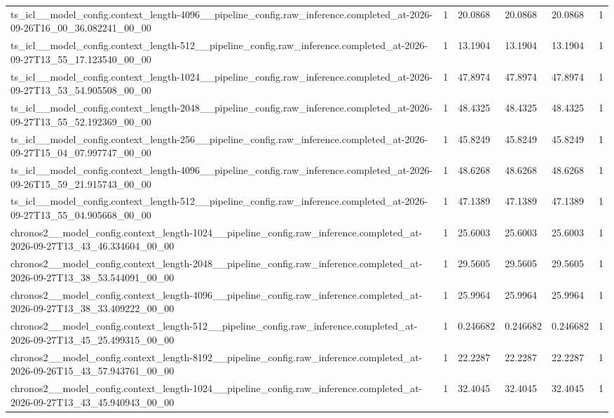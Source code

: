 \begin{tabular}{llllll}
ts\_icl\_\_model\_config.context\_length-4096\_\_pipeline\_config.raw\_inference.completed\_at-2026-09-26T16\_00\_36.082241\_00\_00 & 1 & 20.0868 & 20.0868 & 20.0868 & 1 \\
ts\_icl\_\_model\_config.context\_length-512\_\_pipeline\_config.raw\_inference.completed\_at-2026-09-27T13\_55\_17.123540\_00\_00 & 1 & 13.1904 & 13.1904 & 13.1904 & 1 \\
ts\_icl\_\_model\_config.context\_length-1024\_\_pipeline\_config.raw\_inference.completed\_at-2026-09-27T13\_53\_54.905508\_00\_00 & 1 & 47.8974 & 47.8974 & 47.8974 & 1 \\
ts\_icl\_\_model\_config.context\_length-2048\_\_pipeline\_config.raw\_inference.completed\_at-2026-09-27T13\_55\_52.192369\_00\_00 & 1 & 48.4325 & 48.4325 & 48.4325 & 1 \\
ts\_icl\_\_model\_config.context\_length-256\_\_pipeline\_config.raw\_inference.completed\_at-2026-09-27T15\_04\_07.997747\_00\_00 & 1 & 45.8249 & 45.8249 & 45.8249 & 1 \\
ts\_icl\_\_model\_config.context\_length-4096\_\_pipeline\_config.raw\_inference.completed\_at-2026-09-26T15\_59\_21.915743\_00\_00 & 1 & 48.6268 & 48.6268 & 48.6268 & 1 \\
ts\_icl\_\_model\_config.context\_length-512\_\_pipeline\_config.raw\_inference.completed\_at-2026-09-27T13\_55\_04.905668\_00\_00 & 1 & 47.1389 & 47.1389 & 47.1389 & 1 \\
chronos2\_\_model\_config.context\_length-1024\_\_pipeline\_config.raw\_inference.completed\_at-2026-09-27T13\_43\_46.334604\_00\_00 & 1 & 25.6003 & 25.6003 & 25.6003 & 1 \\
chronos2\_\_model\_config.context\_length-2048\_\_pipeline\_config.raw\_inference.completed\_at-2026-09-27T13\_38\_53.544091\_00\_00 & 1 & 29.5605 & 29.5605 & 29.5605 & 1 \\
chronos2\_\_model\_config.context\_length-4096\_\_pipeline\_config.raw\_inference.completed\_at-2026-09-27T13\_38\_33.409222\_00\_00 & 1 & 25.9964 & 25.9964 & 25.9964 & 1 \\
chronos2\_\_model\_config.context\_length-512\_\_pipeline\_config.raw\_inference.completed\_at-2026-09-27T13\_45\_25.499315\_00\_00 & 1 & 0.246682 & 0.246682 & 0.246682 & 1 \\
chronos2\_\_model\_config.context\_length-8192\_\_pipeline\_config.raw\_inference.completed\_at-2026-09-26T15\_43\_57.943761\_00\_00 & 1 & 22.2287 & 22.2287 & 22.2287 & 1 \\
chronos2\_\_model\_config.context\_length-1024\_\_pipeline\_config.raw\_inference.completed\_at-2026-09-27T13\_43\_45.940943\_00\_00 & 1 & 32.4045 & 32.4045 & 32.4045 & 1 \\

\end{tabular}
